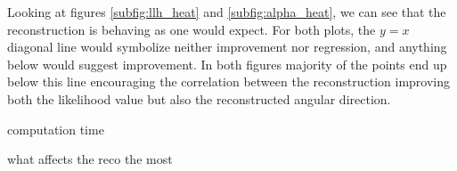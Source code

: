 Looking at figures \ref{subfig:llh_heat} and \ref{subfig:alpha_heat}, we can see that the reconstruction is behaving as one would expect. For both plots, the $y=x$ diagonal line would symbolize neither improvement nor regression, and anything below would suggest improvement. In both figures majority of the points end up below this line encouraging the correlation between the reconstruction improving both the likelihood value but also the reconstructed angular direction. 


computation time

what affects the reco the most


